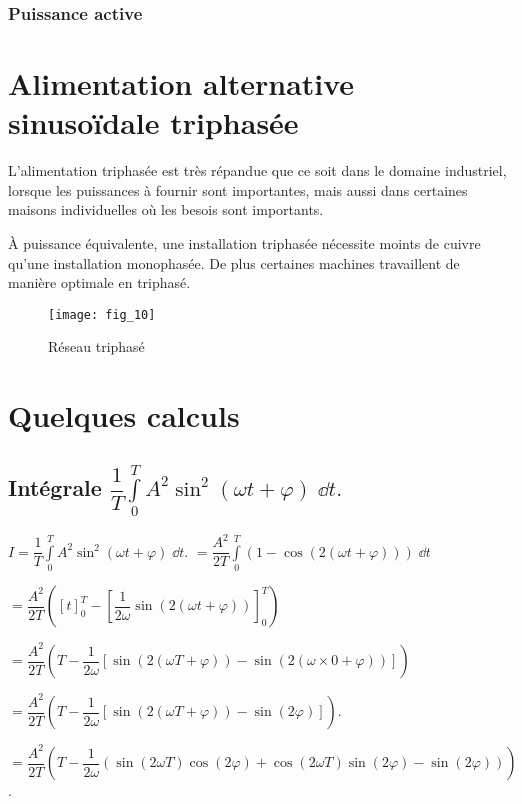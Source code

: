\subsubsection{Puissance active}


\section{Alimentation alternative sinusoïdale triphasée}
L'alimentation triphasée est très répandue que ce soit dans le domaine industriel, lorsque les puissances à fournir sont importantes, mais aussi dans certaines maisons individuelles où les besois sont importants.

À puissance équivalente, une installation triphasée nécessite moints de cuivre qu'une installation monophasée. De plus certaines machines travaillent de manière optimale en triphasé. 

\begin{figure}[!h]
\centering
\texttt{[image: fig\_10]}
\caption{Réseau triphasé \label{fig:ge:cours:&0}}
\end{figure}

\section{Quelques calculs}

\subsection{Intégrale $\dfrac{1}{T} \int\limits_{0}^{T} A^2 \sin^2(\omega t + \varphi)\; \dd t.$ \label{calcul:01}}

$I = \dfrac{1}{T} \int\limits_{0}^{T} A^2 \sin^2(\omega t + \varphi)\; \dd t.$
$= \dfrac{ A^2}{2 T} \int\limits_{0}^{T} \left( 1 - \cos\left( 2\left(\omega t + \varphi\right)\right)\right)\; \dd t$


$= {\dfrac{ A^2}{2 T}\left( \left[t\right]_{0}^{T} -  \left[\dfrac{1}{2\omega}\sin\left( 2\left(\omega t + \varphi\right)\right)\right]_{0}^{T}  \right)}$

$= {\dfrac{ A^2}{2 T}\left( T -  \dfrac{1}{2\omega}\left[
\sin\left( 2\left(\omega T + \varphi\right)\right)
- \sin\left( 2\left(\omega \times 0 + \varphi\right)\right)\right]  \right)}$

$= {\dfrac{ A^2}{2 T}\left( T -  \dfrac{1}{2\omega}\left[
\sin\left( 2\left(\omega T + \varphi\right)\right)
- \sin\left( 2 \varphi\right)\right]  \right)}$. 

$= {\dfrac{ A^2}{2 T}\left( T -  \dfrac{1}{2\omega}\left(
\sin\left( 2\omega T \right)\cos\left( 2\varphi\right)
+\cos\left( 2\omega T \right)\sin\left( 2\varphi\right)
- \sin\left( 2 \varphi\right)\right)  \right)}$. 

